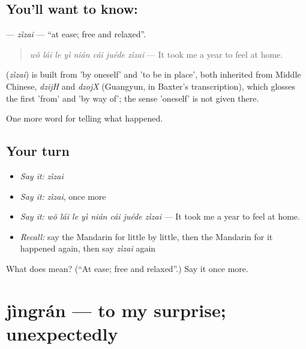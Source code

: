 \subsection*{You'll want to know: }
\textbf{} — \emph{zìzai} — \textquotedblleft{}at ease; free and relaxed\textquotedblright{}.

\begin{quote}
\textbf{} \emph{wǒ lái le yì nián cái juéde zìzai} — It took me a year to feel at home.
\end{quote}

\begin{cousinweb}
\textbf{} (\emph{zìzai}) is built from  'by oneself' and  'to be in place', both inherited from Middle Chinese, \emph{dzijH} and \emph{dzojX} (Guangyun, in Baxter's transcription), which glosses the first 'from' and 'by way of'; the sense 'oneself' is not given there.
\end{cousinweb}

\begin{grammarlens}[title={What you've built}]
One more word for telling what happened.
\end{grammarlens}

\subsection*{Your turn}
\begin{itemize}
\raggedright
  \item \emph{Say it:} \emph{zìzai}
  \item \emph{Say it:} \emph{zìzai}, once more
  \item \emph{Say it:} \emph{wǒ lái le yì nián cái juéde zìzai} — It took me a year to feel at home.
  \item \emph{Recall:} say the Mandarin for little by little, then the Mandarin for it happened again, then say \emph{zìzai} again
\end{itemize}

\begin{tcolorbox}[breakable,colback=teal!4,colframe=teal!35!black,title={Before you move on}]
What does  mean? (\textquotedblleft{}At ease; free and relaxed\textquotedblright{}.) Say it once more.
\end{tcolorbox}
\section[jìngrán]{jìngrán — to my surprise; unexpectedly}


